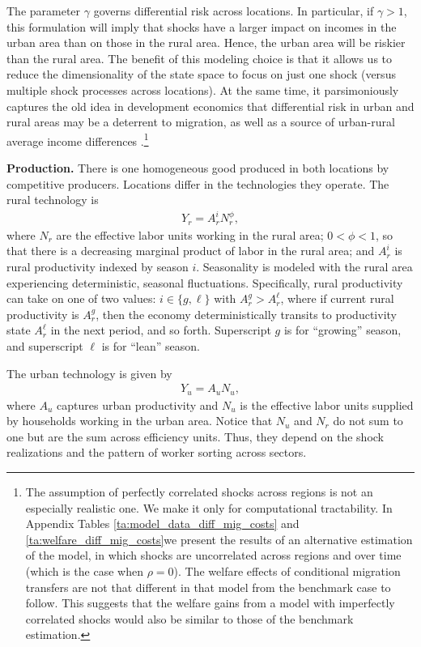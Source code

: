 \documentclass[12pt,pdftex]{article}
\begin{document}
The parameter $\gamma$ governs differential risk across locations. In particular, if $\gamma > 1$, this formulation will imply that shocks have a larger impact on incomes in the urban area than on those in the rural area. Hence, the urban area will be riskier than the rural area. The benefit of this modeling choice is that it allows us to reduce the dimensionality of the state space to focus on just one shock (versus multiple shock processes across locations). At the same time, it parsimoniously captures the old idea in development economics that differential risk in urban and rural areas may be a deterrent to migration, as well as a source of urban-rural average income differences \citep{hato70}.\footnote{The assumption of perfectly correlated shocks across regions is not an especially realistic one. We make it only for computational tractability. In Appendix Tables \ref{ta:model_data_diff_mig_costs} and \ref{ta:welfare_diff_mig_costs}we present the results of an alternative estimation of the model, in which shocks are uncorrelated across regions and over time (which is the case when $\rho=0$). The welfare effects of conditional migration transfers are not that different in that model from the benchmark case to follow. This suggests that the welfare gains from a model with imperfectly correlated shocks would also be similar to those of the benchmark estimation.}

\textbf{Production.} There is one homogeneous good produced in both locations by competitive producers. Locations differ in the technologies they operate. The rural technology is
\begin{align}
Y_r = A^{i}_{r} N_r^\phi,
\end{align}
where $N_r$ are the effective labor units working in the rural area; $0<\phi <1$, so that there is a decreasing marginal product of labor in the rural area; and $A^{i}_{r}$ is rural productivity indexed by season $i$. Seasonality is modeled with the rural area experiencing deterministic, seasonal fluctuations. Specifically, rural productivity can take on one of two values: $i \in \{g,\ell \}$ with  $A^{g}_{r} > A^{\ell}_{r}$, where if current rural productivity is $A^{g}_{r}$, then the economy deterministically transits to productivity state $A^{\ell}_{r}$ in the next period, and so forth. Superscript $g$ is for ``growing'' season, and superscript $\ell$ is for ``lean'' season.

The urban technology is given by
\begin{align}
Y_u = A_u N_{u},
\end{align}
where $A_u$ captures urban productivity and $N_u$ is the effective labor units supplied by households working in the urban area. Notice that $N_u$ and $N_r$ do not sum to one but are the sum across efficiency units. Thus, they depend on the shock realizations and the pattern of worker sorting across sectors.
\end{document}
